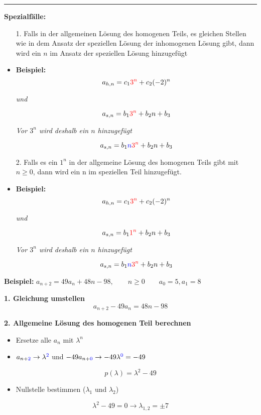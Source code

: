 \hrule

\textbf{Spezialfälle:}

\begin{itemize}
\item[1.] Falls in der allgemeinen Lösung des homogenen Teils, es gleichen Stellen wie in dem Ansatz der speziellen Lösung der inhomogenen Lösung gibt, dann wird ein $n$ im Ansatz der speziellen Lösung hinzugefügt
\item \textbf{Beispiel:} $$a_{h,n} = c_1 {\color{red}3^n} + c_2(-2)^n$$ \begin{center}
\textit{und}\end{center} $$a_{s,n} = b_1 {\color{red}3^n} + b_2 n + b_3$$ \begin{center} \textit{Vor $3^n$ wird deshalb ein $n$ hinzugefügt} \end{center} $$a_{s,n} = b_1 {\color{blue}n}{\color{red}3^n} + b_2 n + b_3$$
\item[2.] Falls es ein $1^n$ in der allgemeine Lösung des homogenen Teils gibt mit $n \geq 0$, dann wird ein n im speziellen Teil hinzugefügt.
\item \textbf{Beispiel:} $$a_{h,n} = c_1 {\color{red}3^n} + c_2(-2)^n$$ \begin{center}
\textit{und}\end{center} $$a_{s,n} = b_1 {\color{red}1^n} + b_2 n + b_3$$ \begin{center} \textit{Vor $3^n$ wird deshalb ein $n$ hinzugefügt} \end{center} $$a_{s,n} = b_1 {\color{blue}n}{\color{red}3^n} + b_2 n + b_3$$
\end{itemize}

\newpage

\textbf{Beispiel:} $a_{n+2} = 49 a_n + 48n - 98, \qquad n \geq 0 \qquad a_0 = 5, a_1 = 8$

\textbf{1. Gleichung umstellen}
$$
a_{n+2} - 49a_n = 48n - 98
$$

\textbf{2. Allgemeine Lösung des homogenen Teil berechnen}

\begin{itemize}
\item Ersetze alle $a_n$ mit $\lambda ^n$
\item $a_{n+{\color{blue}2}} \rightarrow \lambda ^{\color{blue}2}$ und $-49a_{n+{\color{blue}0}} \rightarrow -49 \lambda ^{{\color{blue}0}} = -49$
\end{itemize}
$$
p(\lambda) =  \lambda ^2 - 49
$$

\begin{itemize}
\item Nullstelle bestimmen ($\lambda _1$ und $\lambda _2$)
\end{itemize}
$$
\lambda ^2 - 49 = 0 \rightarrow \lambda _{1,2} = \pm 7
$$

